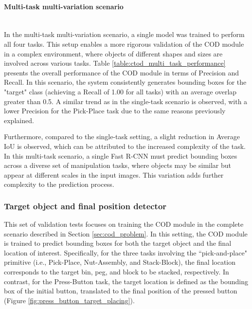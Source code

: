 

\paragraph*{Multi-task multi-variation scenario}\mbox{}\\
In the multi-task multi-variation scenario, a single model was trained to perform all four tasks. This setup enables a more rigorous validation of the COD module in a complex environment, where objects of different shapes and sizes are involved across various tasks. Table \ref{table:ctod_multi_task_performance} presents the overall performance of the COD module in terms of Precision and Recall. In this scenario, the system consistently generates bounding boxes for the "target" class (achieving a Recall of 1.00 for all tasks) with an average overlap greater than 0.5. A similar trend as in the single-task scenario is observed, with a lower Precision for the Pick-Place task due to the same reasons previously explained.

Furthermore, compared to the single-task setting, a slight reduction in Average IoU is observed, which can be attributed to the increased complexity of the task. In this multi-task scenario, a single Fast R-CNN must predict bounding boxes across a diverse set of manipulation tasks, where objects may be similar but appear at different scales in the input images. This variation adds further complexity to the prediction process.


\subsubsection{Target object and final position detector}
\label{sec:cod_tofpd}
This set of validation tests focuses on training the COD module in the complete scenario described in Section \ref{sec:cod_problem}. In this setting, the COD module is trained to predict bounding boxes for both the target object and the final location of interest. Specifically, for the three tasks involving the ``pick-and-place" primitive (i.e., Pick-Place, Nut-Assembly, and Stack-Block), the final location corresponds to the target bin, peg, and block to be stacked, respectively. In contrast, for the Press-Button task, the target location is defined as the bounding box of the initial button, translated to the final position of the pressed button (Figure \ref{fig:press_button_target_placing}).


